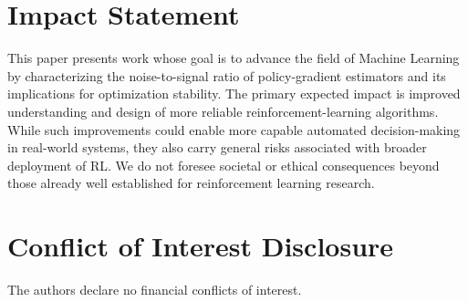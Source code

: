 \section*{Impact Statement}
\label{sec:impact-statement}

This paper presents work whose goal is to advance the field of Machine Learning by characterizing the noise-to-signal ratio of policy-gradient estimators and its implications for optimization stability. The primary expected impact is improved understanding and design of more reliable reinforcement-learning algorithms. While such improvements could enable more capable automated decision-making in real-world systems, they also carry general risks associated with broader deployment of RL. We do not foresee societal or ethical consequences beyond those already well established for reinforcement learning research.


\section*{Conflict of Interest Disclosure}
\label{sec:conflicts-of-interest}
The authors declare no financial conflicts of interest.
